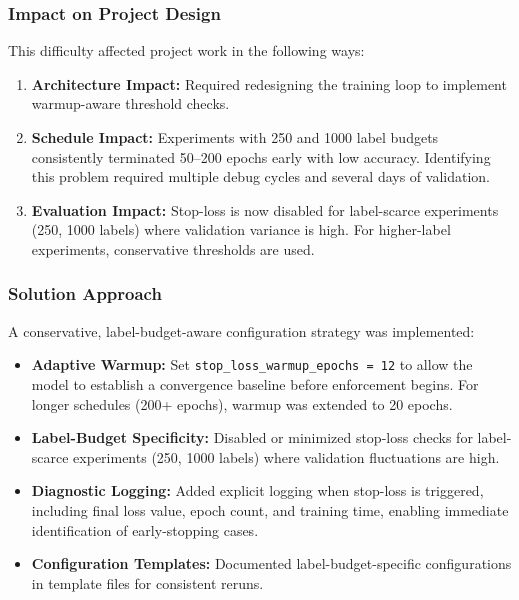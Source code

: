 \subsubsection{Impact on Project Design}

This difficulty affected project work in the following ways:

\begin{enumerate}
    \item \textbf{Architecture Impact:} Required redesigning the training loop to implement warmup-aware threshold checks.
    
    \item \textbf{Schedule Impact:} Experiments with 250 and 1000 label budgets consistently terminated 50--200 epochs early with low accuracy. Identifying this problem required multiple debug cycles and several days of validation.
    
    \item \textbf{Evaluation Impact:} Stop-loss is now disabled for label-scarce experiments (250, 1000 labels) where validation variance is high. For higher-label experiments, conservative thresholds are used.
\end{enumerate}

\subsubsection{Solution Approach}

A conservative, label-budget-aware configuration strategy was implemented:

\begin{itemize}
    \item \textbf{Adaptive Warmup:} Set \texttt{stop\_loss\_warmup\_epochs = 12} to allow the model to establish a convergence baseline before enforcement begins. For longer schedules (200+ epochs), warmup was extended to 20 epochs.

    \item \textbf{Label-Budget Specificity:} Disabled or minimized stop-loss checks for label-scarce experiments (250, 1000 labels) where validation fluctuations are high.
    
    \item \textbf{Diagnostic Logging:} Added explicit logging when stop-loss is triggered, including final loss value, epoch count, and training time, enabling immediate identification of early-stopping cases.
    
    \item \textbf{Configuration Templates:} Documented label-budget-specific configurations in template files for consistent reruns.
\end{itemize}

